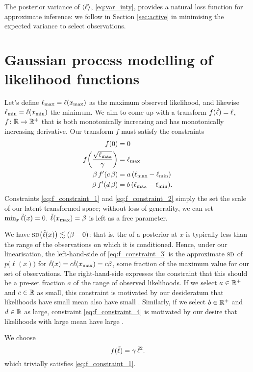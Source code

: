\documentclass[twoside]{article}
\begin{document}
The posterior variance of $\langle \ell \rangle$, \eqref{eq:var_inty}, provides a natural loss function for approximate inference: we follow \citet{osborne2012active} in Section \ref{sec:active} in minimising the expected variance to select observations. 

\section{Gaussian process modelling of likelihood functions}
Let's define $\ell_\text{max} = \ell(x_\text{max})$ as the maximum observed likelihood, and likewise $\ell_\text{min} = \ell(x_\text{min})$ the minimum. We aim to come up with a transform $f({\tilde{\ell}}) = \ell$, $f\colon \mathbb{R} \to \mathbb{R}^+$ that is both monotonically increasing and has monotonically increasing derivative. 
Our transform $f$ must satisfy the constraints 
\begin{align}
 f(0) & = 0 \label{eq:f_constraint_1}\\
 f\biggl(\frac{\sqrt{\ell_\text{max}}}{\gamma}\biggr) & = \ell_\text{max} 
\label{eq:f_constraint_2}\\
 \beta\, f'(c\,\beta) & = a\,(\ell_\text{max} - \ell_\text{min}) \label{eq:f_constraint_3}\\
 \beta\, f'(d\,\beta) & = b\,(\ell_\text{max} - \ell_\text{min}). 
\label{eq:f_constraint_4}
\end{align}
Constraints \eqref{eq:f_constraint_1} and \eqref{eq:f_constraint_2} simply the set the scale of our latent transformed space; without loss of generality, we can set  
$\text{min}_{x}\,{\tilde{\ell}}(x)=0$. ${\tilde{\ell}}(x_\text{max})=\beta$ is left as a free parameter. 

We have $\textsc{sd}\bigl({\tilde{\ell}}(x)\bigr) \lesssim (\beta - 0)$: that is, the \sd of a \gp posterior at $x$ is typically less than the range of the observations on which it is conditioned. Hence, under our linearisation, the left-hand-side of \eqref{eq:f_constraint_3} is the approximate $\textsc{sd}$ of $p\bigl(\ell(x)\bigl)$ for ${\tilde{\ell}}(x) = c {\tilde{\ell}}(x_\text{max})=c \beta$, some fraction of the maximum value for our set of observations. The right-hand-side expresses the constraint that this should be a pre-set fraction $a$ of the range of observed likelihoods. If we select $a\in \mathbb{R}^+$ and $c\in \mathbb{R}$ as small, this constraint is motivated by our desideratum that likelihoods have small mean also have small \sd. Similarly, if we select $b\in \mathbb{R}^+$ and $d\in \mathbb{R}$ as large, constraint \eqref{eq:f_constraint_4} is motivated by our desire that likelihoods with large mean have large \sd .


We choose
\begin{equation}
 f({\tilde{\ell}}) = \gamma\,{\tilde{\ell}}^2.
\end{equation}
which trivially satisfies \eqref{eq:f_constraint_1}.
\end{document}
